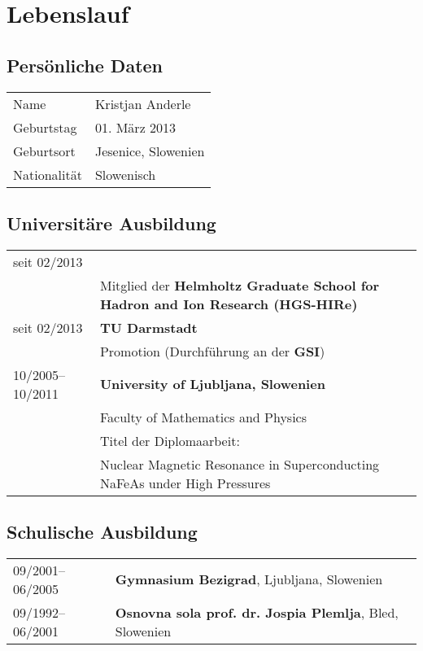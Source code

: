 
\chapter*{Lebenslauf}

\section*{Pers\"onliche Daten}
\begin{tabular}{p{}p{}}
  \hfill Name & Kristjan Anderle\\
  \hfill Geburtstag & 01. M\"{a}rz 2013\\
  \hfill Geburtsort & Jesenice, Slowenien\\
  \hfill Nationalit\"at & Slowenisch\\
\end{tabular}

\section*{Universit\"are Ausbildung}
\begin{tabular}{p{}p{}}
  \hfill seit 02/2013 \\
  & Mitglied der \textbf{Helmholtz Graduate School for Hadron and Ion Research (HGS-HIRe)} \\
  \hfill seit 02/2013 & \textbf{TU Darmstadt} \\
  & Promotion (Durchf\"uhrung an der \textbf{GSI})\\
  \hfill 10/2005--10/2011 & \textbf{University of Ljubljana, Slowenien}\\
  & Faculty of Mathematics and Physics\\
  & Titel der Diplomaarbeit: \\
  & Nuclear Magnetic Resonance in Superconducting NaFeAs under High Pressures \\
\end{tabular}

\section*{Schulische Ausbildung}
\begin{tabular}{p{}p{}}
  \hfill 09/2001--06/2005 & \textbf{Gymnasium Bezigrad}, Ljubljana, Slowenien\\
  \hfill 09/1992--06/2001 & \textbf{Osnovna sola prof. dr. Jospia Plemlja}, Bled, Slowenien\\
\end{tabular}
